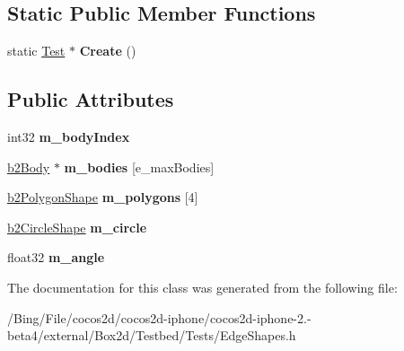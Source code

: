 \subsection*{Static Public Member Functions}
\begin{DoxyCompactItemize}
\item 
\hypertarget{class_edge_shapes_aaa4bc3aed113a1fad128226986c63e2d}{static \hyperlink{class_test}{Test} $\ast$ {\bfseries Create} ()}\label{class_edge_shapes_aaa4bc3aed113a1fad128226986c63e2d}

\end{DoxyCompactItemize}
\subsection*{Public Attributes}
\begin{DoxyCompactItemize}
\item 
\hypertarget{class_edge_shapes_a2eebba7ef51f5bb06ab420ab251ff36e}{int32 {\bfseries m\-\_\-body\-Index}}\label{class_edge_shapes_a2eebba7ef51f5bb06ab420ab251ff36e}

\item 
\hypertarget{class_edge_shapes_ab207435528b448d0c8abdb46c91dc030}{\hyperlink{classb2_body}{b2\-Body} $\ast$ {\bfseries m\-\_\-bodies} \mbox{[}e\-\_\-max\-Bodies\mbox{]}}\label{class_edge_shapes_ab207435528b448d0c8abdb46c91dc030}

\item 
\hypertarget{class_edge_shapes_acf30ef799263dc0a88dcf117d8afe820}{\hyperlink{classb2_polygon_shape}{b2\-Polygon\-Shape} {\bfseries m\-\_\-polygons} \mbox{[}4\mbox{]}}\label{class_edge_shapes_acf30ef799263dc0a88dcf117d8afe820}

\item 
\hypertarget{class_edge_shapes_a64804ba04ff2374fed41a1bd6121a9ee}{\hyperlink{classb2_circle_shape}{b2\-Circle\-Shape} {\bfseries m\-\_\-circle}}\label{class_edge_shapes_a64804ba04ff2374fed41a1bd6121a9ee}

\item 
\hypertarget{class_edge_shapes_acbe95c978502b482d2332404cf480f74}{float32 {\bfseries m\-\_\-angle}}\label{class_edge_shapes_acbe95c978502b482d2332404cf480f74}

\end{DoxyCompactItemize}


The documentation for this class was generated from the following file\-:\begin{DoxyCompactItemize}
\item 
/\-Bing/\-File/cocos2d/cocos2d-\/iphone/cocos2d-\/iphone-\/2.-\/beta4/external/\-Box2d/\-Testbed/\-Tests/Edge\-Shapes.\-h\end{DoxyCompactItemize}
